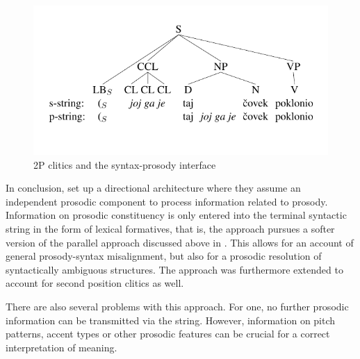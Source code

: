 \documentclass[output=paper,hidelinks]{langscibook}
\begin{document}
\begin{figure}
  \centering
  \includegraphics[width=.6\textwidth]{figures/Prosody/Boegel_Figure_14-cstr.pdf}
\caption{2P clitics and the syntax-prosody interface \citep[13]{boegel-etal2010}}
\end{figure}


\noindent In conclusion, \citet{boegeletal09} set up a directional architecture where they assume an independent prosodic component to process information related to prosody. Information on prosodic constituency is only entered into the terminal syntactic string in the  form of lexical formatives, that is, the approach pursues a softer version of the parallel approach discussed above in . This allows for an account of general prosody-syntax misalignment, but also for a prosodic resolution of syntactically ambiguous structures. The approach was furthermore extended to account for second position clitics as well.

There are also several problems with this approach. For one, no further prosodic information can be transmitted via the string. However, information on pitch patterns, accent types or other prosodic features can be crucial for a correct interpretation of meaning. 
\end{document}
